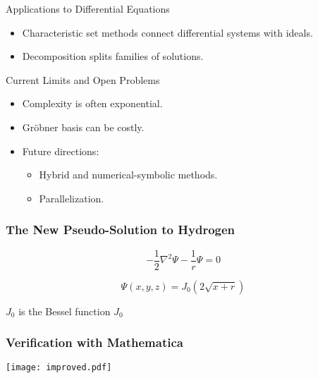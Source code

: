 \documentclass[11pt]{beamer}
\begin{document}
\begin{frame}{Applications to Differential Equations}
\begin{itemize}
  \item Characteristic set methods connect differential systems with ideals.
  \item Decomposition splits families of solutions.
\end{itemize}
\end{frame}

\begin{frame}{Current Limits and Open Problems}
\begin{itemize}
  \item Complexity is often exponential.
  \item Gröbner basis can be costly.
  \item Future directions:
    \begin{itemize}
      \item Hybrid and numerical-symbolic methods.
      \item Parallelization.
    \end{itemize}
\end{itemize}
\end{frame}

\begin{frame}
\frametitle{The New Pseudo-Solution to Hydrogen}

\[ - \frac{1}{2} \nabla^2 \Psi - \frac{1}{r} \Psi = 0 \]

\[ \Psi(x,y,z) = J_0(2\sqrt{x+r}) \]

\vskip 0.5in

$J_0$ is the Bessel function $J_0$

\end{frame}

\begin{frame}
\frametitle{Verification with Mathematica}
\texttt{[image: improved.pdf]}
\end{frame}
\end{document}
